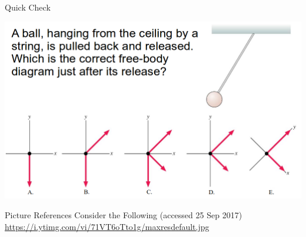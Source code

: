 \documentclass{beamer}
\newcommand{\red}[1]{{\color{red}{#1}}}
\newcommand{\checkL}[2]{\begin{textblock*}{1cm}(#1,#2){\Large \red{\Checkmark}}\end{textblock*}}
\begin{document}
\begin{frame}{Quick Check}
\begin{center}
   \includegraphics[width=\textwidth]{../figures/QC5_13.png}
\end{center}
\only<2>{\checkL{4.0cm}{7.7cm}}
\end{frame}

\begin{frame}{Picture References}
\tiny
Consider the Following (accessed 25 Sep 2017) \href{https://i.ytimg.com/vi/71VT6oTto1g/maxresdefault.jpg}{https://i.ytimg.com/vi/71VT6oTto1g/maxresdefault.jpg} \\
\end{frame}
\end{document}
